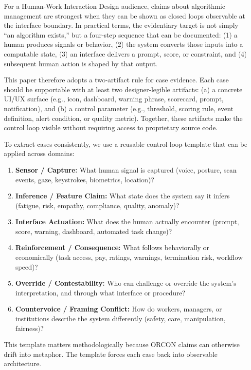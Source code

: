 \documentclass[runningheads]{llncs}
\begin{document}
For a Human-Work Interaction Design audience, claims about algorithmic management are strongest when they can be shown as closed loops observable at the interface boundary. In practical terms, the evidentiary target is not simply ``an algorithm exists,'' but a four-step sequence that can be documented: (1) a human produces signals or behavior, (2) the system converts those inputs into a computable state, (3) an interface delivers a prompt, score, or constraint, and (4) subsequent human action is shaped by that output.

This paper therefore adopts a two-artifact rule for case evidence. Each case should be supportable with at least two designer-legible artifacts: (a) a concrete UI/UX surface (e.g., icon, dashboard, warning phrase, scorecard, prompt, notification), and (b) a control parameter (e.g., threshold, scoring rule, event definition, alert condition, or quality metric). Together, these artifacts make the control loop visible without requiring access to proprietary source code.

To extract cases consistently, we use a reusable control-loop template that can be applied across domains:
\begin{enumerate}
\item \textbf{Sensor / Capture:} What human signal is captured (voice, posture, scan events, gaze, keystrokes, biometrics, location)?
\item \textbf{Inference / Feature Claim:} What state does the system say it infers (fatigue, risk, empathy, compliance, quality, anomaly)?
\item \textbf{Interface Actuation:} What does the human actually encounter (prompt, score, warning, dashboard, automated task change)?
\item \textbf{Reinforcement / Consequence:} What follows behaviorally or economically (task access, pay, ratings, warnings, termination risk, workflow speed)?
\item \textbf{Override / Contestability:} Who can challenge or override the system's interpretation, and through what interface or procedure?
\item \textbf{Countervoice / Framing Conflict:} How do workers, managers, or institutions describe the system differently (safety, care, manipulation, fairness)?
\end{enumerate}

This template matters methodologically because ORCON claims can otherwise drift into metaphor. The template forces each case back into observable architecture.
\end{document}
